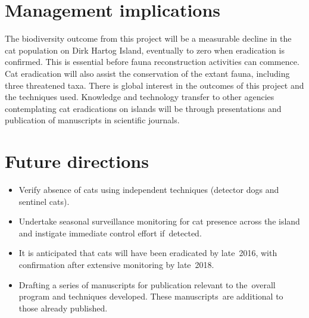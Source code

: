\documentclass[version=last,
    paper=a4, %
    10pt, %
    usenames,
    dvipsnames,
    oneside, %
    headings=openany, %
    DIV=15 %
]{scrbook}
\begin{document}
\section*{Management implications}
The biodiversity outcome from this project will be a measurable decline
in the cat population on Dirk Hartog Island, eventually to zero when
eradication is confirmed. This is essential before fauna reconstruction
activities can commence. Cat eradication will also assist the
conservation of the extant fauna, including three threatened taxa. There
is global interest in the outcomes of this project and the techniques
used. Knowledge and technology transfer to other agencies contemplating
cat eradications on islands will be through presentations and
publication of manuscripts in scientific journals.



\section*{Future directions}
\begin{itemize}
\itemsep1pt\parskip0pt
\item
  Verify absence of cats using independent techniques (detector dogs and
  sentinel cats).
\item
  Undertake seasonal surveillance monitoring for cat presence across the
  island and instigate immediate control effort if~detected.
\item
  It is anticipated that cats will have been eradicated by late~2016,
  with confirmation after extensive monitoring by late~2018.
\item
  Drafting a series of manuscripts for publication relevant to
  the~overall program and techniques developed. These manuscripts~are
  additional to those already published.
\end{itemize}



\end{document}
